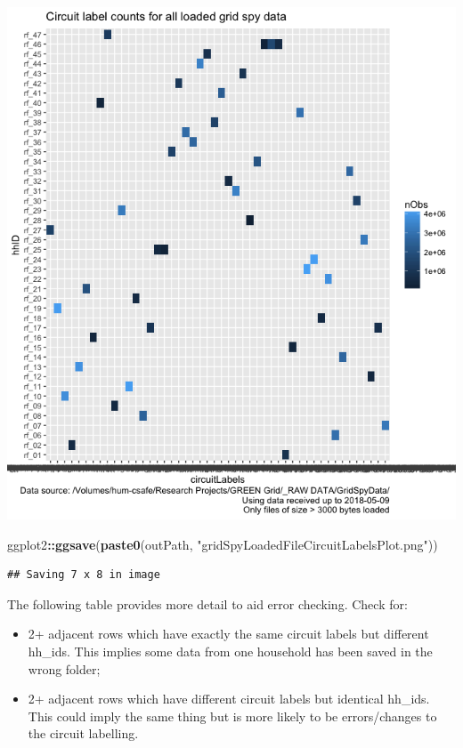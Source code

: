 \documentclass[]{article}
\newenvironment{Shaded}{\begin{snugshade}}{\end{snugshade}}
\newcommand{\KeywordTok}[1]{\textcolor[rgb]{0.13,0.29,0.53}{\textbf{#1}}}
\newcommand{\StringTok}[1]{\textcolor[rgb]{0.31,0.60,0.02}{#1}}
\newcommand{\OperatorTok}[1]{\textcolor[rgb]{0.81,0.36,0.00}{\textbf{#1}}}
\newcommand{\NormalTok}[1]{#1}
\providecommand{\tightlist}{%
  \setlength{\itemsep}{0pt}\setlength{\parskip}{0pt}}
\begin{document}
\includegraphics{processNZGGElecCons1minData_files/figure-html/plotCircuitLabelIssuesAsTile-1.png}

\begin{Shaded}
\begin{Highlighting}[]
\NormalTok{ggplot2}\OperatorTok{::}\KeywordTok{ggsave}\NormalTok{(}\KeywordTok{paste0}\NormalTok{(outPath, }\StringTok{"gridSpyLoadedFileCircuitLabelsPlot.png"}\NormalTok{))}
\end{Highlighting}
\end{Shaded}

\begin{verbatim}
## Saving 7 x 8 in image
\end{verbatim}

The following table provides more detail to aid error checking. Check
for:

\begin{itemize}
\tightlist
\item
  2+ adjacent rows which have exactly the same circuit labels but
  different hh\_ids. This implies some data from one household has been
  saved in the wrong folder;
\item
  2+ adjacent rows which have different circuit labels but identical
  hh\_ids. This could imply the same thing but is more likely to be
  errors/changes to the circuit labelling.
\end{itemize}
\end{document}
